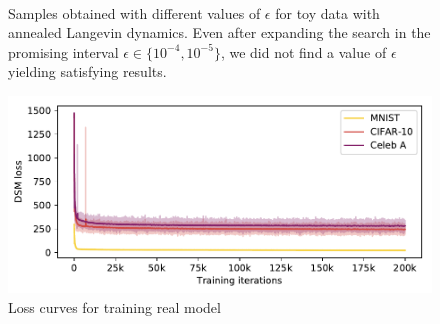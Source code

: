 \documentclass{article}
\begin{document}
\begin{figure}[h!]
  \centering
     \\
     \caption{Samples obtained with different values of $\epsilon$ for toy data with annealed Langevin dynamics. Even after expanding the search in the promising interval $\epsilon \in \{10^{-4}, 10^{-5}\}$, we did not find a value of $\epsilon$ yielding satisfying results.}
     \label{fig:eps}
\end{figure}


\newpage


\begin{figure}[h!]
    \centering
    \includegraphics[width=0.90\linewidth]{figures/loss_real.pdf}
    \caption{Loss curves for training real model}
    \label{fig:losses}
\end{figure}

\vspace{0.8cm}
\end{document}
